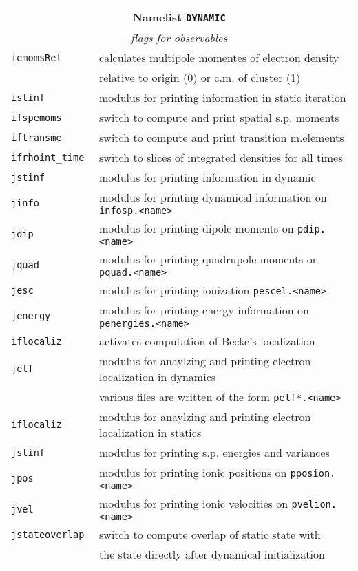 \documentclass[12pt]{article}
\begin{document}
\begin{tabular}{ll}
\hline
\multicolumn{2}{c}{Namelist {\tt DYNAMIC}} in {\tt for005.<name>} \\
\hline
\multicolumn{2}{c}{\it flags for observables} \\
\hline
{\tt iemomsRel        }& calculates multipole momentes of electron density \\
{\tt                  }& relative to origin (0) or c.m. of cluster (1)\\
{\tt istinf           }& modulus for printing information in static iteration \\
{\tt ifspemoms        }& switch to compute and print spatial s.p. moments\\
{\tt iftransme        }& switch to compute and print transition m.elements\\
{\tt ifrhoint\_time   }& switch to slices of integrated densities for all times\\
{\tt jstinf           }& modulus for printing information in dynamic \\
{\tt jinfo            }& modulus for printing dynamical information on {\tt
  infosp.<name>} \\
{\tt jdip             }& modulus for printing dipole moments on {\tt pdip.<name>}\\
{\tt jquad            }& modulus for printing quadrupole moments on {\tt pquad.<name>}\\
{\tt jesc            }& modulus for printing ionization {\tt pescel.<name>}\\
{\tt jenergy          }& modulus for printing energy information on {\tt penergies.<name>} \\
{\tt iflocaliz}        & activates computation of Becke's localization
\\
{\tt jelf}             & modulus for anaylzing and printing electron
localization in dynamics
\\
 & various files are written of the form {\tt pelf*.<name>}
\\
{\tt iflocaliz}             & modulus for anaylzing and printing electron
localization in statics
\\
{\tt jstinf}           & modulus for printing s.p. energies and variances
\\
{\tt jpos}           & modulus for printing ionic positions on {\tt pposion.<name>}
\\
{\tt jvel}           & modulus for printing ionic velocities on {\tt pvelion.<name>}
\\
{\tt jstateoverlap}  & switch to compute overlap of static state
                       with\\
                     & the state directly after dynamical
                       initialization
\\
\hline
\end{tabular}
\end{document}
